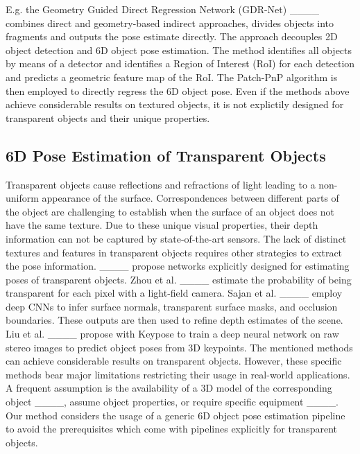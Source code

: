 E.g. the Geometry Guided Direct Regression Network (GDR-Net) ____ combines direct and geometry-based indirect approaches, divides objects into fragments and outputs the pose estimate directly. 
The approach decouples 2D object detection and 6D object pose estimation.
The method identifies all objects by means of a detector and identifies a Region of Interest (RoI) for each detection and predicts a geometric feature map of the RoI.
The Patch-PnP algorithm is then employed to directly regress the 6D object pose. 
Even if the methods above achieve considerable results on textured objects, it is not explictily designed for transparent objects and their unique properties.

\subsection{6D Pose Estimation of Transparent Objects}
Transparent objects cause reflections and refractions of light leading to a non-uniform appearance of the surface.
Correspondences between different parts of the object are challenging to establish when the surface of an object does not have the same texture. 
Due to these unique visual properties, their depth information can not be captured by state-of-the-art sensors.
The lack of distinct textures and features in transparent objects requires other strategies to extract the pose information.
____ propose networks explicitly designed for estimating poses of transparent objects. 
Zhou et al. ____ estimate the probability of being transparent for each pixel with a light-field camera.
Sajan et al. ____ employ deep CNNs to infer surface normals, transparent surface masks, and occlusion boundaries. 
These outputs are then used to refine depth estimates of the scene. 
Liu et al. ____ propose with Keypose to train a deep neural network on raw stereo images to predict object poses from 3D keypoints.
The mentioned methods can achieve considerable results on transparent objects.
However, these specific methods bear major limitations restricting their usage in real-world applications.
A frequent assumption is the availability of a 3D model of the corresponding object ____, assume object properties, or require specific equipment ____.
Our method considers the usage of a generic 6D object pose estimation pipeline to avoid the prerequisites which come with pipelines explicitly for transparent objects.

